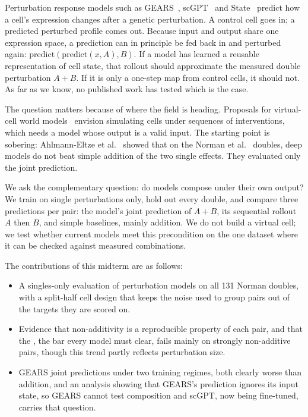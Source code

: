Perturbation response models such as GEARS~\cite{roohani2024gears},
scGPT~\cite{cui2024scgpt} and State~\cite{arc2025state} predict how a cell's expression
changes after a genetic perturbation. A control cell goes in; a predicted perturbed profile
comes out. Because input and output share one expression space, a prediction can in
principle be fed back in and perturbed again: $\mathrm{predict}(\mathrm{predict}(x, A), B)$.
If a model has learned a reusable representation of cell state, that rollout should
approximate the measured double perturbation $A{+}B$. If it is only a one-step map from
control cells, it should not. As far as we know, no published work has tested which is the
case.

The question matters because of where the field is heading. Proposals for virtual-cell
world models~\cite{xingsong2026} envision simulating cells under sequences of interventions,
which needs a model whose output is a valid input. The starting point is sobering:
Ahlmann-Eltze et al.~\cite{ahlmann2025} showed that on the Norman et
al.~\cite{norman2019} doubles, deep models do not beat simple addition of the two single
effects. They evaluated only the joint prediction.

We ask the complementary question: do models compose under their own output? We train on
single perturbations only, hold out every double, and compare three predictions per pair:
the model's joint prediction of $A{+}B$, its sequential rollout $A$ then $B$, and simple
baselines, mainly addition. We do not build a virtual cell; we test whether current models
meet this precondition on the one dataset where it can be checked against measured
combinations.

The contributions of this midterm are as follows:
\begin{itemize}[nosep]
    \item A singles-only evaluation of perturbation models on all 131 Norman doubles, with a
    split-half cell design that keeps the noise used to group pairs out of the targets they
    are scored on.
    \item Evidence that non-additivity is a reproducible property of each pair, and that the
    \addnull, the bar every model must clear, fails mainly on strongly non-additive pairs, though this
    trend partly reflects perturbation size.
    \item GEARS joint predictions under two training regimes, both clearly worse than
    addition, and an analysis showing that GEARS's prediction ignores its input state, so GEARS
    cannot test composition and scGPT, now being fine-tuned, carries that question.
\end{itemize}

